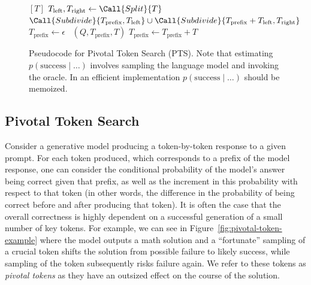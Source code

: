 \documentclass[11pt]{article}
\begin{document}
\begin{figure}
    \begin{algorithmic}
                 
                    \State \Return $[T]$
                \EndIf
                \State $T_\mathrm{left},T_\mathrm{right} \gets \Call{Split}{T}$ 
                \State \Return $\Call{Subdivide}{T_\mathrm{prefix}, T_\mathrm{left}} \cup \Call{Subdivide}{T_\mathrm{prefix} + T_\mathrm{left}, T_\mathrm{right}}$
            \EndProcedure
            \State $T_\mathrm{prefix} \gets \epsilon$
                    \State \Yield~$(Q,T_\mathrm{prefix},T)$ 
                \EndIf
                \State $T_\mathrm{prefix} \gets T_\mathrm{prefix} + T$
            \EndFor
        \EndProcedure
    \end{algorithmic}
    \caption{Pseudocode for Pivotal Token Search (PTS). Note that estimating $p(\mathrm{success} \mid \dots)$ involves sampling the language model and invoking the oracle. In an efficient implementation $p(\mathrm{success} \mid \dots)$ should be memoized.}
    \label{fig:pts-pseudocode}
\end{figure}



\subsection{Pivotal Token Search} \label{sec:pivotal}


Consider a generative model producing a token-by-token response to a given prompt. For each token produced, which corresponds to a prefix of the model response, one can consider the conditional probability of the model's answer being correct given that prefix, as well as the increment in this probability with respect to that token (in other words, the difference in the probability of being correct before and after producing that token). It is often the case that the overall correctness is highly dependent on a successful generation of a small number of key tokens. For example, we can see in Figure~\ref{fig:pivotal-token-example} where the model outputs a math solution and a ``fortunate'' sampling of a crucial token  shifts the solution from possible failure to likely success, while sampling of the token  subsequently risks failure again. We refer to these tokens as \emph{pivotal tokens} as they have an outsized effect on the course of the solution.
\end{document}
